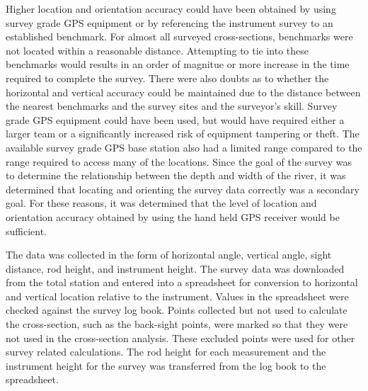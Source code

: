 \begin{linenumbers}
Higher location and orientation accuracy could have been obtained by using survey grade GPS equipment or by referencing the instrument survey to an established benchmark.  For almost all surveyed cross-sections, benchmarks were not located within a reasonable distance.  Attempting to tie into these benchmarks would results in an order of magnitue or more increase in the time required to complete the survey.  There were also doubts as to whether the horizontal and vertical accuracy could be maintained due to the distance between the nearest benchmarks and the survey sites and the surveyor's skill.  Survey grade GPS equipment could have been used, but would have required either a larger team or a significantly increased risk of equipment tampering or theft.  The available survey grade GPS base station also had a limited range compared to the range required to access many of the locations.  Since the goal of the survey was to determine the relationship between the depth and width of the river, it was determined that locating and orienting the survey data correctly was a secondary goal. For these reasons, it was determined that the level of location and orientation accuracy obtained by using the hand held GPS receiver would be sufficient.

The data was collected in the form of horizontal angle, vertical angle, sight distance, rod height, and instrument height.  The survey data was downloaded from the total station and entered into a spreadsheet for conversion to horizontal and vertical location relative to the instrument.  Values in the spreadsheet were checked against the survey log book.  Points collected but not used to calculate the cross-section, such as the back-sight points, were marked so that they were not used in the cross-section analysis.  These excluded points were used for other survey related calculations.  The rod height for each measurement and the instrument height for the survey was transferred from the log book to the spreadsheet.  


\end{linenumbers}

